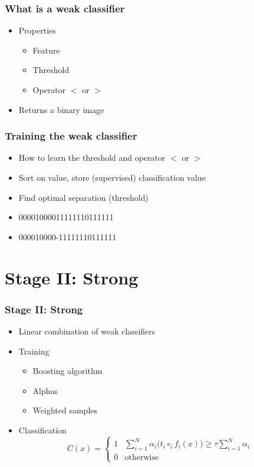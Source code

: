 \documentclass{beamer}
\begin{document}
\frame
{
  \frametitle{What is a weak classifier}
	\begin{itemize}
		\item <+-| alert@+> Properties
			\begin{itemize}
				\item <+-| alert@+> Feature
				\item <+-| alert@+> Threshold
				\item <+-| alert@+> Operator $<$ or $>$
			\end{itemize}
		\item <+-| alert@+> Returns a binary image
	\end{itemize}
}
\frame
{
  \frametitle{Training the weak classifier}
	\begin{itemize}
		\item <+-| alert@+> How to learn the threshold and operator $<$ or $>$
		\item <+-| alert@+> Sort on value, store (supervised) classification value
		\item <+-| alert@+> Find optimal separation (threshold)
		\item <+-| alert@+> 00001000011111110111111
		\item <+-| alert@+> 000010000-11111110111111
	\end{itemize}
}

\section{Stage II: Strong}
\frame
{
  \frametitle{Stage II: Strong}
	
  \begin{itemize}
  \item <+-| alert@+> Linear combination of weak classifiers
  \item <+-| alert@+> Training
  \begin{itemize}
  	\item Boosting algorithm
  	\item Alphas
  	\item Weighted samples
  \end{itemize}
  \item <+-| alert@+> Classification
	\begin{displaymath}
	C(x) = 
		\left\{ \begin{array}{ll}
			1 & \sum^N_{i=1} \alpha_i \big(t_i \circ_i f_i(x)\big) \ge \tau \sum^N_{i=1}\alpha_i \\
			0 & \textrm{otherwise}
		\end{array} \right.
	\end{displaymath}
  \end{itemize}
}
\end{document}
